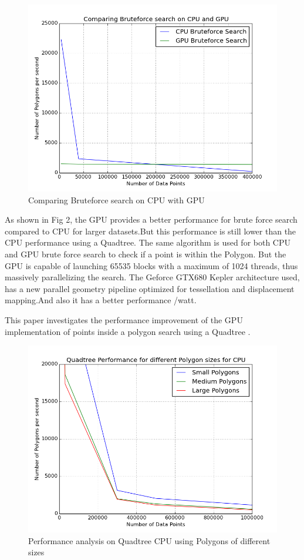 \documentclass{article}
\begin{document}
\begin{figure}[H]
\centering
    \includegraphics[scale=0.55]{CPU_GPU_brute_new_2}
    \caption{Comparing Bruteforce search on CPU with GPU}
  \end{figure}



As shown in Fig 2, the GPU provides a better performance for brute force search compared to CPU for larger datasets.But this performance is still lower than the CPU performance using a Quadtree.
The same algorithm is used for both CPU and GPU brute force search to check if a point is within the Polygon. But the  GPU is capable of launching 65535 blocks with a maximum of 1024 threads, thus massively parallelizing the search.
The Geforce GTX680 Kepler architecture used, has a new parallel geometry pipeline optimized for tessellation and displacement mapping.And also it has a better performance /watt.

This paper investigates the performance improvement of the GPU implementation of points inside a polygon search using a Quadtree .


\begin{figure}[H]
\includegraphics[scale=0.6]{Different_Sized_Polygon_logScale_cpu04_10}
\caption{Performance analysis on Quadtree CPU using Polygons of different sizes}
\end{figure}
\end{document}
